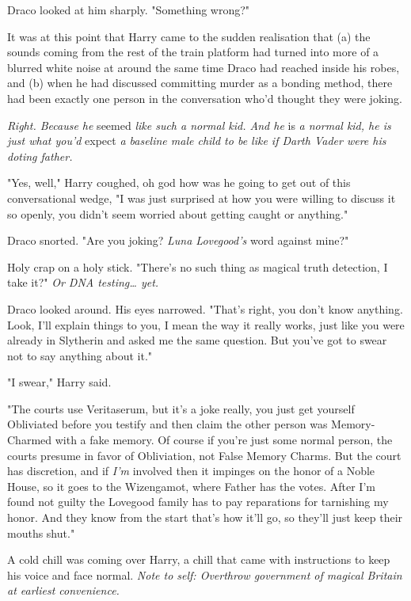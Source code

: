 Draco looked at him sharply. "Something wrong?"

It was at this point that Harry came to the sudden realisation that (a) the 
sounds coming from the rest of the train platform had turned into more of a 
blurred white noise at around the same time Draco had reached inside his robes, 
and (b) when he had discussed committing murder as a bonding method, there had 
been exactly one person in the conversation who'd thought they were joking.

\emph{Right. Because he} seemed\emph{ like such a normal kid. And he} is\emph{ 
a normal kid, he is just what you'd} expect\emph{ a baseline male child to be 
like if Darth Vader were his doting father.}

"Yes, well," Harry coughed, oh god how was he going to get out of this 
conversational wedge, "I was just surprised at how you were willing to discuss 
it so openly, you didn't seem worried about getting caught or anything."

Draco snorted. "Are you joking? \emph{Luna Lovegood's} word against mine?"

Holy crap on a holy stick. "There's no such thing as magical truth detection, I 
take it?" \emph{Or DNA testing{\ldots} yet.}

Draco looked around. His eyes narrowed. "That's right, you don't know anything. 
Look, I'll explain things to you, I mean the way it really works, just like you 
were already in Slytherin and asked me the same question. But you've got to 
swear not to say anything about it."

"I swear," Harry said.

"The courts use Veritaserum, but it's a joke really, you just get yourself 
Obliviated before you testify and then claim the other person was 
Memory-Charmed with a fake memory. Of course if you're just some normal person, 
the courts presume in favor of Obliviation, not False Memory Charms. But the 
court has discretion, and if \emph{I'm} involved then it impinges on the honor 
of a Noble House, so it goes to the Wizengamot, where Father has the votes. 
After I'm found not guilty the Lovegood family has to pay reparations for 
tarnishing my honor. And they know from the start that's how it'll go, so 
they'll just keep their mouths shut."

A cold chill was coming over Harry, a chill that came with instructions to keep 
his voice and face normal. \emph{Note to self: Overthrow government of magical 
Britain at earliest convenience.}

